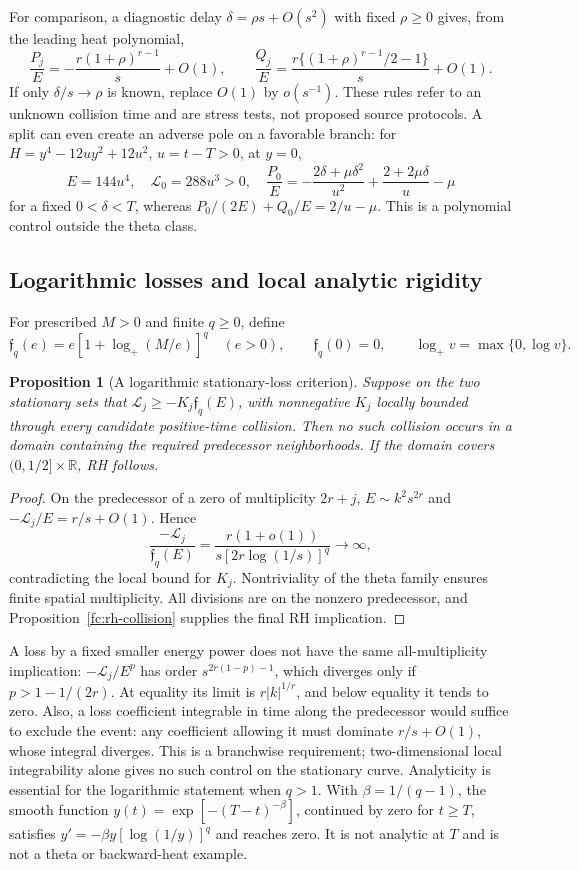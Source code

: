 \documentclass[11pt]{article}
\numberwithin{equation}{section}
\newtheorem{proposition}[theorem]{Proposition}
\theoremstyle{definition}
\theoremstyle{remark}
\newcommand{\R}{\mathbb R}
\newcommand{\Lag}{\mathcal L}
\begin{document}
For comparison, a diagnostic delay $\delta=\rho s+O(s^2)$ with fixed
$\rho\ge0$ gives, from the leading heat polynomial,
\[
 \frac{P_j}{E}=-\frac{r(1+\rho)^{r-1}}s+O(1),\qquad
 \frac{Q_j}{E}=
 \frac{r\{(1+\rho)^{r-1}/2-1\}}s+O(1).
\]
If only $\delta/s\to\rho$ is known, replace $O(1)$ by $o(s^{-1})$.
These rules refer to an unknown collision time and are stress tests,
not proposed source protocols.  A split can even create an adverse pole
on a favorable branch: for
$H=y^4-12uy^2+12u^2$, $u=t-T>0$, at $y=0$,
\[
 E=144u^4,\quad\Lag_0=288u^3>0,\quad
 \frac{P_0}{E}=-\frac{2\delta+\mu\delta^2}{u^2}
                 +\frac{2+2\mu\delta}{u}-\mu
\]
for a fixed $0<\delta<T$, whereas
$P_0/(2E)+Q_0/E=2/u-\mu$.  This is a polynomial control outside
the theta class.

\subsection{Logarithmic losses and local analytic rigidity}
\label{subsec:logarithmic-loss}

For prescribed $M>0$ and finite $q\ge0$, define
\[
 \mathfrak f_q(e)=e[1+\log_+(M/e)]^q\quad(e>0),\qquad
 \mathfrak f_q(0)=0,\qquad\log_+v=\max\{0,\log v\}.
\]
\begin{proposition}[A logarithmic stationary-loss criterion]
\label{prop:logarithmic-collision-criterion}
Suppose on the two stationary sets that
$\Lag_j\ge-K_j\mathfrak f_q(E)$, with nonnegative $K_j$ locally
bounded through every candidate positive-time collision.  Then no such
collision occurs in a domain containing the required predecessor
neighborhoods.  If the domain covers $(0,1/2]\times\R$, RH follows.
\end{proposition}
\begin{proof}
On the predecessor of a zero of multiplicity $2r+j$,
$E\sim k^2s^{2r}$ and $-\Lag_j/E=r/s+O(1)$.  Hence
\[
 \frac{-\Lag_j}{\mathfrak f_q(E)}
 =\frac{r(1+o(1))}{s[2r\log(1/s)]^q}\longrightarrow\infty,
\]
contradicting the local bound for $K_j$.  Nontriviality of the theta
family ensures finite spatial multiplicity.  All divisions are on the
nonzero predecessor, and Proposition~\ref{fc:rh-collision} supplies
the final RH implication.
\end{proof}

A loss by a fixed smaller energy power does not have the same
all-multiplicity implication: $-\Lag_j/E^p$ has order
$s^{2r(1-p)-1}$, which diverges only if $p>1-1/(2r)$.
At equality its limit is $r|k|^{1/r}$, and below equality it tends
to zero.  Also, a loss coefficient integrable in time along the
predecessor would suffice to exclude the event: any coefficient allowing
it must dominate $r/s+O(1)$, whose integral diverges.  This is a
branchwise requirement; two-dimensional local integrability alone gives
no such control on the stationary curve.
Analyticity is essential for the logarithmic statement when $q>1$.
With $\beta=1/(q-1)$, the smooth function
$y(t)=\exp[-(T-t)^{-\beta}]$, continued by zero for $t\ge T$,
satisfies $y'=-\beta y[\log(1/y)]^q$ and reaches zero.  It is not
analytic at $T$ and is not a theta or backward-heat example.
\end{document}
